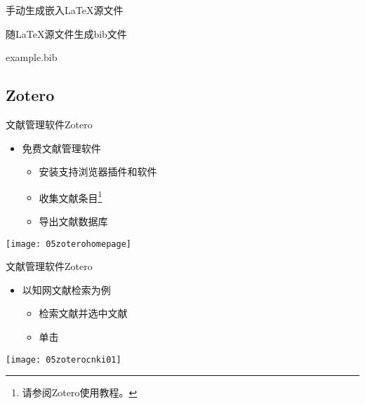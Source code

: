 \documentclass[fontset = none, t]{ctexbeamer}
\begin{document}
\begin{frame}[fragile]{手动生成}{嵌入\LaTeX 源文件}
\begin{spacing}{1.3}
\begin{center}
\begin{minipage}[h]{0.55\linewidth}
\begin{textcb}{随\LaTeX 源文件生成bib文件}
\begin{filecontents}{example.bib}
\subsection[Zotero]{Zotero}
\begin{frame}[fragile]{文献管理软件}{Zotero}
  \begin{spacing}{1.5}
    \begin{itemize}
    \item 免费文献管理软件
      \begin{itemize}
      \item 安装支持浏览器插件和软件
      \item 收集文献条目\footnote[frame,2]{请参阅Zotero使用教程。}
      \item 导出文献数据库
      \end{itemize}
    \end{itemize}    
    \begin{center}
      \texttt{[image: 05zoterohomepage]}
    \end{center}
  \end{spacing}
\end{frame}

\begin{frame}[fragile]{文献管理软件}{Zotero}
  \begin{spacing}{1.2}
    \begin{itemize}
    \item 以\alert{知网}文献检索为例
      \begin{itemize}
      \item 检索文献并选中文献
      \item 单击
      \end{itemize}
    \end{itemize}    
    \begin{center}
      \begin{annotatedFigure}
        {\texttt{[image: 05zoterocnki01]}}
      \end{annotatedFigure}      
    \end{center}
  \end{spacing}
\end{frame}


\end{filecontents}
\end{textcb}
\end{minipage}
\end{center}
\end{spacing}
\end{frame}
\end{document}
